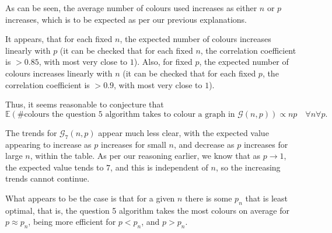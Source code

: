 \documentclass{article}
\begin{document}
\begin{center}
	
\end{center}

As can be seen, the average number of colours used increases as either $n$ or $p$ increases, which is to be expected as per our previous explanations.

It appears, that for each fixed $n$, the expected number of colours increases linearly with $p$ (it can be checked that for each fixed $n$, the correlation coefficient is $>0.85$, with most very close to $1$). Also, for fixed $p$, the expected number of colours increases linearly with $n$ (it can be checked that for each fixed $p$, the correlation coefficient is $>0.9$, with most very close to $1$).

Thus, it seems reasonable to conjecture that $$\mathbb{E}(\text{\#colours the question 5 algorithm takes to colour a graph in $\mathcal{G}(n,p)$}) \propto np \quad \forall n \forall p.$$

\begin{center}
	
\end{center}

The trends for $\mathcal{G}_7(n,p)$ appear much less clear, with the expected value appearing to increase as $p$ increases for small $n$, and decrease as $p$ increases for large $n$, within the table. As per our reasoning earlier, we know that as $p \to 1$, the expected value tends to $7$, and this is independent of $n$, so the increasing trends cannot continue.

What appears to be the case is that for a given $n$ there is some $p_n$ that is least optimal, that is, the question 5 algorithm takes the most colours on average for $p \approx p_n$, being more efficient for $p < p_n$, and $p > p_n$.
\end{document}
